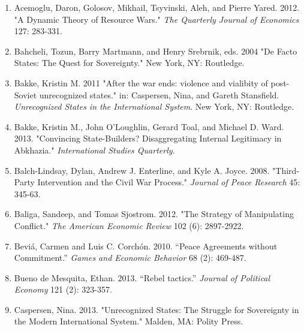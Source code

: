\documentclass[11pt,letterpaper, notitlepage]{article}
\begin{document}
\begin{enumerate}[1.]

\item \hangindent=1cm Acemoglu, Daron, Golosov, Mikhail, Tsyvinski, Aleh, and Pierre Yared. 2012. "A Dynamic Theory of Resource Wars." 
\emph{The Quarterly Journal of Economics} 127: 283-331.

\item \hangindent=1cm Bahcheli, Tozun, Barry Martmann, and Henry Srebrnik, eds. 2004 "De Facto States: The Quest for Sovereignty." New York, NY: Routledge.

\item \hangindent=1cm Bakke, Kristin M. 2011 "After the war ends: violence and vialibity of post-Soviet unrecognized states." in: Caspersen, Nina, and Gareth Stansfield. \emph{Unrecognized States in the International System}. New York, NY: Routledge. 

\item \hangindent=1cm Bakke, Kristin M., John O'Loughlin, Gerard Toal, and Michael D. Ward.  2013.  "Convincing State-Builders? Disaggregating Internal Legitimacy in Abkhazia."  \emph{International Studies Quarterly.} 


\item \hangindent=1cm Balch-Lindsay, Dylan, Andrew J. Enterline, and Kyle A. Joyce.  2008.  "Third-Party Intervention and the Civil War Process."  \emph{Journal of Peace Research} 45: 345-63.

\item \hangindent=1cm Baliga, Sandeep, and Tomas Sjostrom. 2012. "The Strategy of Manipulating Conflict." \emph{The American Economic Review} 102 (6): 2897-2922.

\item \hangindent=1cm Bevi\'{a}, Carmen and Luis C. Corch\'{o}n. 2010. ``Peace Agreements without Commitment.'' \emph{Games and Economic Behavior} 68 (2): 469-487.

\item \hangindent=1cm Bueno de Mesquita, Ethan. 2013. ``Rebel tactics.'' \emph{Journal of Political Economy} 121 (2): 323-357.

\item \hangindent=1cm Caspersen, Nina. 2013. "Unrecognized States: The Struggle for Sovereignty in the Modern International System." Malden, MA: Polity Press.


\end{enumerate}
\end{document}
